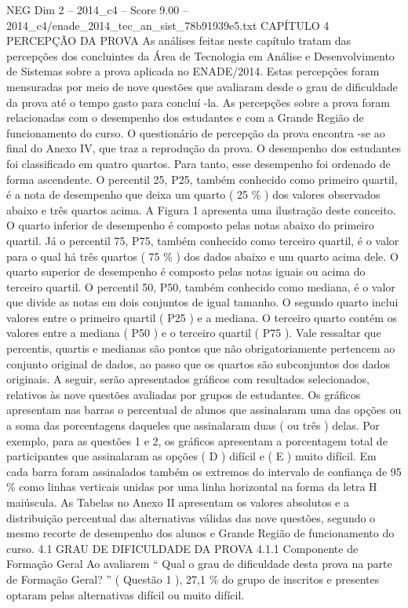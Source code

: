 \begin{textsample}{NEG Dim 2 – 2014\_c4 – Score 9.00 – 2014\_c4/enade\_2014\_tec\_an\_sist\_78b91939e5.txt}  \label{ex:f2_neg_322}
CAPÍTULO 4 PERCEPÇÃO DA PROVA As análises feitas neste capítulo tratam das percepções dos concluintes da Área de Tecnologia em Análise e Desenvolvimento de Sistemas sobre a prova aplicada no ENADE/2014.
Estas percepções foram mensuradas por meio de nove questões que avaliaram desde o grau de dificuldade da prova até o tempo gasto para concluí -la.
As percepções sobre a prova foram relacionadas com o desempenho dos estudantes e com a Grande Região de funcionamento do curso.
O questionário de percepção da prova encontra -se ao final do Anexo IV, que traz a reprodução da prova.
O desempenho dos estudantes foi classificado em quatro quartos.
Para tanto, esse desempenho foi ordenado de forma ascendente.
O percentil 25, P25, também conhecido como primeiro quartil, é a nota de desempenho que deixa um quarto ( 25 \% ) dos valores observados abaixo e três quartos acima.
A Figura 1 apresenta uma ilustração deste conceito.
O quarto inferior de desempenho é composto pelas notas abaixo do primeiro quartil.
Já o percentil 75, P75, também conhecido como terceiro quartil, é o valor para o qual há três quartos ( 75 \% ) dos dados abaixo e um quarto acima dele.
O quarto superior de desempenho é composto pelas notas iguais ou acima do terceiro quartil.
O percentil 50, P50, também conhecido como mediana, é o valor que divide as notas em dois conjuntos de igual tamanho.
O segundo quarto inclui valores entre o primeiro quartil ( P25 ) e a mediana.
O terceiro quarto contém os valores entre a mediana ( P50 ) e o terceiro quartil ( P75 ).
Vale ressaltar que percentis, quartis e medianas são pontos que não obrigatoriamente pertencem ao conjunto original de dados, ao passo que os quartos são subconjuntos dos dados originais.
A seguir, serão apresentados gráficos com resultados selecionados, relativos às nove questões avaliadas por grupos de estudantes.
Os gráficos apresentam nas barras o percentual de alunos que assinalaram uma das opções ou a soma das porcentagens daqueles que assinalaram duas ( ou três ) delas.
Por exemplo, para as questões 1 e 2, os gráficos apresentam a porcentagem total de participantes que assinalaram as opções ( D ) difícil e ( E ) muito difícil.
Em cada barra foram assinalados também os extremos do intervalo de confiança de 95 \% como linhas verticais unidas por uma linha horizontal na forma da letra H maiúscula.
As Tabelas no Anexo II apresentam os valores absolutos e a distribuição percentual das alternativas válidas das nove questões, segundo o mesmo recorte de desempenho dos alunos e Grande Região de funcionamento do curso. 4.1 GRAU DE DIFICULDADE DA PROVA 4.1.1 Componente de Formação Geral Ao avaliarem “ Qual o grau de dificuldade desta prova na parte de Formação Geral? ” ( Questão 1 ), 27,1 \% do grupo de inscritos e presentes optaram pelas alternativas difícil ou muito difícil.

\end{textsample}
